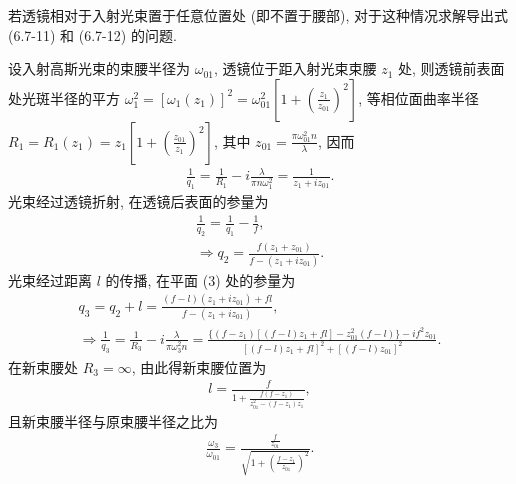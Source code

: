 \documentclass{note}
\begin{document}
\begin{exe}
    若透镜相对于入射光束置于任意位置处 (即不置于腰部), 对于这种情况求解导出式 (6.7-11) 和 (6.7-12) 的问题.
\end{exe}
\begin{pf}
    设入射高斯光束的束腰半径为 $\omega_{01}$, 透镜位于距入射光束束腰 $z_1$ 处, 则透镜前表面处光斑半径的平方 $\omega_1^2=[\omega_1(z_1)]^2=\omega_{01}^2\left[1+\left(\frac{z_1}{z_{01}}\right)^2\right]$, 等相位面曲率半径 $R_1=R_1(z_1)=z_1\left[1+\left(\frac{z_{01}}{z_1}\right)^2\right]$, 其中 $z_{01}=\frac{\pi\omega_{01}^2n}{\lambda}$, 因而
    \begin{align}
        \frac{1}{q_1}=\frac{1}{R_1}-i\frac{\lambda}{\pi n\omega_1^2}=\frac{1}{z_1+iz_{01}}.
    \end{align}
    光束经过透镜折射, 在透镜后表面的参量为
    \begin{gather}
        \frac{1}{q_2}=\frac{1}{q_1}-\frac{1}{f},\\
        \Longrightarrow q_2=\frac{f(z_1+z_{01})}{f-(z_1+iz_{01})}.
    \end{gather}
    光束经过距离 $l$ 的传播, 在平面 (3) 处的参量为
    \begin{gather}
        q_3=q_2+l=\frac{(f-l)(z_1+iz_{01})+fl}{f-(z_1+iz_{01})},\\
        \Longrightarrow\frac{1}{q_3}=\frac{1}{R_3}-i\frac{\lambda}{\pi\omega_3^2n}=\frac{\{(f-z_1)[(f-l)z_1+fl]-z_{01}^2(f-l)\}-if^2z_{01}}{[(f-l)z_1+fl]^2+[(f-l)z_{01}]^2}.
    \end{gather}
    在新束腰处 $R_3=\infty$, 由此得新束腰位置为
    \begin{align}
        l=\frac{f}{1+\frac{f(f-z_1)}{z_{01}^2-(f-z_1)z_1}},
    \end{align}
    且新束腰半径与原束腰半径之比为
    \begin{align}
        \frac{\omega_3}{\omega_{01}}=\frac{\frac{f}{z_{01}}}{\sqrt{1+\left(\frac{f-z_1}{z_{01}}\right)^2}}.
    \end{align}
\end{pf}
\end{document}
